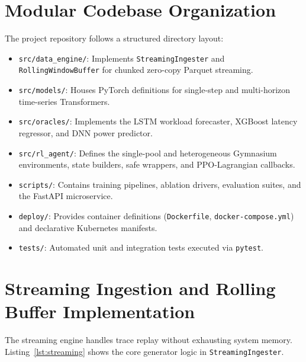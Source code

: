 \documentclass[12pt]{report}
\begin{document}
\section{Modular Codebase Organization}

The project repository follows a structured directory layout:
\begin{itemize}
\item \texttt{src/\allowbreak data\_engine/\allowbreak }: Implements \texttt{StreamingIngester} and \texttt{RollingWindowBuffer} for chunked zero-copy Parquet streaming.
\item \texttt{src/\allowbreak models/\allowbreak }: Houses PyTorch definitions for single-step and multi-horizon time-series Transformers.
\item \texttt{src/\allowbreak oracles/\allowbreak }: Implements the LSTM workload forecaster, XGBoost latency regressor, and DNN power predictor.
\item \texttt{src/\allowbreak rl\_agent/\allowbreak }: Defines the single-pool and heterogeneous Gymnasium environments, state builders, safe wrappers, and PPO-Lagrangian callbacks.
\item \texttt{scripts/\allowbreak }: Contains training pipelines, ablation drivers, evaluation suites, and the FastAPI microservice.
\item \texttt{deploy/\allowbreak }: Provides container definitions (\texttt{Dockerfile}, \texttt{docker-\allowbreak compose.\allowbreak yml}) and declarative Kubernetes manifests.
\item \texttt{tests/\allowbreak }: Automated unit and integration tests executed via \texttt{pytest}.
\end{itemize}

\section{Streaming Ingestion and Rolling Buffer Implementation}

The streaming engine handles trace replay without exhausting system memory. Listing~\ref{lst:streaming} shows the core generator logic in \texttt{StreamingIngester}.
\end{document}
